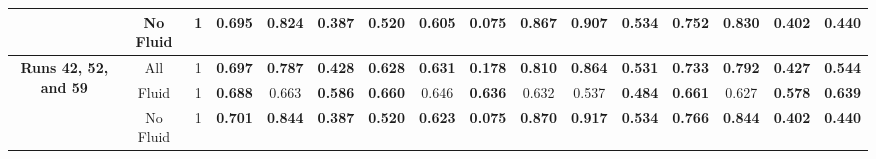 \begin{table}[!ht]
{\begin{tabular}{|c|c|c|ccc|ccc|ccc|c|c|c|c|}
			& No Fluid & 1 & \multicolumn{1}{c|}{0.695} & \multicolumn{1}{c|}{0.824} & \textbf{0.387} & \multicolumn{1}{c|}{\textbf{0.520}} & \multicolumn{1}{c|}{0.605} & \textbf{0.075} & \multicolumn{1}{c|}{0.867} & \multicolumn{1}{c|}{0.907} & \textbf{0.534} & 0.752 & 0.830 & \textbf{0.402} & \textbf{0.440} \\
			
			\hline
			\hline
			
			\multirow{3}{*}{\parbox{2cm}{\textbf{Runs 42, 52, and 59}}} & All & 1 & \multicolumn{1}{c|}{\textbf{0.697}} & \multicolumn{1}{c|}{\textbf{0.787}} & \textbf{0.428} & \multicolumn{1}{c|}{\textbf{0.628}} & \multicolumn{1}{c|}{\textbf{0.631}} & \textbf{0.178} & \multicolumn{1}{c|}{\textbf{0.810}} & \multicolumn{1}{c|}{\textbf{0.864}} & \textbf{0.531} & \textbf{0.733} & \textbf{0.792} & \textbf{0.427} & \textbf{0.544} \\
			
			& Fluid & 1 & \multicolumn{1}{c|}{\textbf{0.688}} & \multicolumn{1}{c|}{0.663} & \textbf{0.586} & \multicolumn{1}{c|}{\textbf{0.660}} & \multicolumn{1}{c|}{0.646} & \textbf{0.636} & \multicolumn{1}{c|}{0.632} & \multicolumn{1}{c|}{0.537} & \textbf{0.484} & \textbf{0.661} & 0.627 & \textbf{0.578} & \textbf{0.639} \\
			
			& No Fluid & 1 & \multicolumn{1}{c|}{\textbf{0.701}} & \multicolumn{1}{c|}{\textbf{0.844}} & \textbf{0.387} & \multicolumn{1}{c|}{\textbf{0.520}} & \multicolumn{1}{c|}{\textbf{0.623}} & \textbf{0.075} & \multicolumn{1}{c|}{\textbf{0.870}} & \multicolumn{1}{c|}{\textbf{0.917}} & \textbf{0.534} & \textbf{0.766} & \textbf{0.844} & \textbf{0.402} & \textbf{0.440} \\
			
			\hline
			
	\end{tabular}}
	\label{tab:Experiment2FinalResults}
\end{table}

